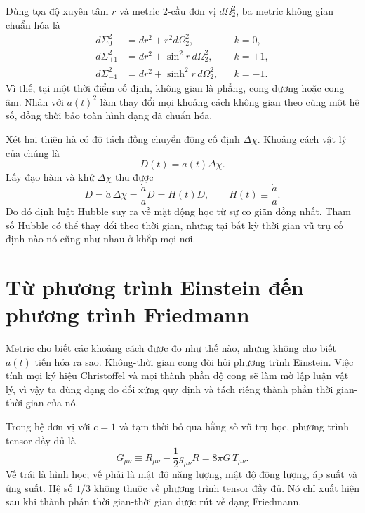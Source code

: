 Dùng tọa độ xuyên tâm \(r\) và metric 2-cầu đơn vị \(d\Omega_2^2\), ba metric không gian chuẩn hóa là
\begin{align}
d\Sigma_0^2 &= dr^2+r^2d\Omega_2^2,
&& k=0,
\label{eq:c04-flat-space}\\
d\Sigma_{+1}^2 &= dr^2+\sin^2 r\,d\Omega_2^2,
&& k=+1,
\label{eq:c04-spherical-space}\\
d\Sigma_{-1}^2 &= dr^2+\sinh^2 r\,d\Omega_2^2,
&& k=-1.
\label{eq:c04-hyperbolic-space}
\end{align}
Vì thế, tại một thời điểm cố định, không gian là phẳng, cong dương hoặc cong âm. Nhân với \(a(t)^2\) làm thay đổi mọi khoảng cách không gian theo cùng một hệ số, đồng thời bảo toàn hình dạng đã chuẩn hóa.

Xét hai thiên hà có độ tách đồng chuyển động cố định \(\Delta\chi\). Khoảng cách vật lý của chúng là
\begin{equation}
D(t)=a(t)\Delta\chi.
\end{equation}
Lấy đạo hàm và khử \(\Delta\chi\) thu được
\begin{equation}
\dot D=\dot a\,\Delta\chi
      =\frac{\dot a}{a}D
      =H(t)D,
\qquad
H(t)\equiv\frac{\dot a}{a}.
\label{eq:c04-hubble-law}
\end{equation}
Do đó định luật Hubble suy ra về mặt động học từ sự co giãn đồng nhất. Tham số Hubble có thể thay đổi theo thời gian, nhưng tại bất kỳ thời gian vũ trụ cố định nào nó cũng như nhau ở khắp mọi nơi.

\section{Từ phương trình Einstein đến phương trình Friedmann}

Metric cho biết các khoảng cách được đo như thế nào, nhưng không cho biết \(a(t)\) tiến hóa ra sao. Không-thời gian cong đòi hỏi phương trình Einstein. Việc tính mọi ký hiệu Christoffel và mọi thành phần độ cong sẽ làm mờ lập luận vật lý, vì vậy ta dùng dạng do đối xứng quy định và tách riêng thành phần thời gian-thời gian của nó.

Trong hệ đơn vị với \(c=1\) và tạm thời bỏ qua hằng số vũ trụ học, phương trình tensor đầy đủ là
\begin{equation}
G_{\mu\nu}
\equiv
R_{\mu\nu}-\frac12 g_{\mu\nu}R
=8\pi G\,T_{\mu\nu}.
\label{eq:c04-einstein}
\end{equation}
Vế trái là hình học; vế phải là mật độ năng lượng, mật độ động lượng, áp suất và ứng suất. Hệ số \(1/3\) không thuộc về phương trình tensor đầy đủ. Nó chỉ xuất hiện sau khi thành phần thời gian-thời gian được rút về dạng Friedmann.

